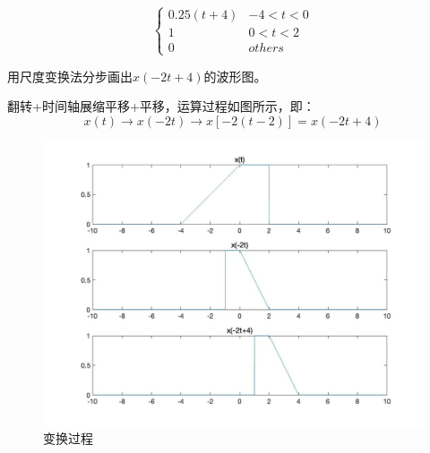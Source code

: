 \documentclass[a4paper,12pt]{ctexart}
\begin{document}
\begin{equation}
    \left\{\begin{matrix}
        0.25(t+4) & -4<t<0 \\
        1         & 0<t<2  \\
        0         & others
    \end{matrix}\right.
\end{equation}
\par
用尺度变换法分步画出$x(-2t+4)$的波形图。

翻转+时间轴展缩平移+平移，运算过程如图所示，即：
\begin{equation}
    x(t)\rightarrow x(-2t)\rightarrow x[-2(t-2)]=x(-2t+4)
\end{equation}

\begin{figure}[H]
    \centering
    \includegraphics[width=14cm]{2_new.jpg}
    \caption{变换过程}
\end{figure}
\end{document}

